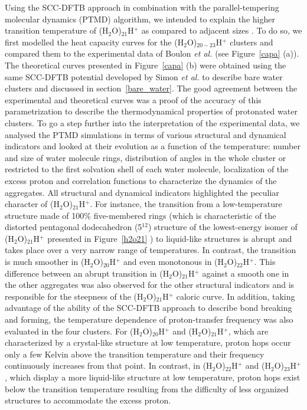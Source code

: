 \documentclass[]{interact}
\theoremstyle{plain}%
\theoremstyle{definition}
\theoremstyle{remark}
\begin{document}
Using the SCC-DFTB approach in combination with the parallel-tempering molecular dynamics (PTMD) algorithm, we
intended to explain the higher transition temperature of (H$_{2}$O)$_{21}$H$^{+}$ as compared to adjacent sizes
\cite{Korchagina2017}. To do so, we first modelled the heat capacity curves for the (H$_{2}$O)$_{20-23}$H$^{+}$
clusters and compared them to the experimental data of  Boulon \textit{et al.} (see Figure~\ref{capa} (a)). The theoretical
curves presented in Figure~\ref{capa} (b) were obtained using the same SCC-DFTB potential developed by Simon \textit{et al.}
to describe bare water clusters \cite{SimonPCCP2012,SimonJCP2013} and discussed in section~\ref{bare_water}. The
good agreement between the experimental and theoretical curves was a proof of the accuracy of this parametrization
to describe the thermodynamical properties of protonated water clusters. To go a step further into the interpretation of
the experimental data, we analysed the PTMD simulations in terms of various structural and dynamical indicators and looked
at their evolution as a function of the temperature: number and size of water molecule rings, distribution of angles in the whole
cluster or restricted to the first solvation shell of each water molecule, localization of the excess proton and correlation functions
to characterize the dynamics of the aggregates. All structural and dynamical indicators highlighted the peculiar character of 
(H$_{2}$O)$_{21}$H$^{+}$. For instance, the transition from a low-temperature structure made of 100\% five-membered rings
(which is characteristic of the distorted pentagonal dodecahedron (5$^{12}$) structure of the lowest-energy isomer of
(H$_{2}$O)$_{21}$H$^{+}$ presented in Figure~\ref{h2o21} \cite{Hodges2000,Wu2005,Iyengar2005,Miyazaki2004,Shin2004,Singh2006})
to liquid-like structures is abrupt and takes place over a very narrow range of temperatures. In contrast, the transition is much
smoother in (H$_{2}$O)$_{20}$H$^{+}$ and even monotonous in (H$_{2}$O)$_{22}$H$^{+}$. This difference between an
abrupt transition in (H$_{2}$O)$_{21}$H$^{+}$ against a smooth one in the other aggregates was also observed for the other
structural indicators and is responsible for the steepness of the (H$_{2}$O)$_{21}$H$^{+}$ caloric curve. In addition,
taking advantage of  the ability of the SCC-DFTB approach to describe bond breaking and forming, the temperature dependence
of proton-transfer frequency was also evaluated in the four clusters. For (H$_{2}$O)$_{20}$H$^{+}$ and (H$_{2}$O)$_{21}$H$^{+}$,
which are characterized by a crystal-like structure at low temperature, proton hops occur only a few Kelvin above the transition
temperature and their frequency continuously increases from that point. In contrast, in (H$_{2}$O)$_{22}$H$^{+}$ and
(H$_{2}$O)$_{23}$H$^{+}$, which display a more liquid-like structure at low temperature, proton hops exist below the
transition temperature resulting from the difficulty of less organized structures to accommodate the excess proton.
\end{document}
